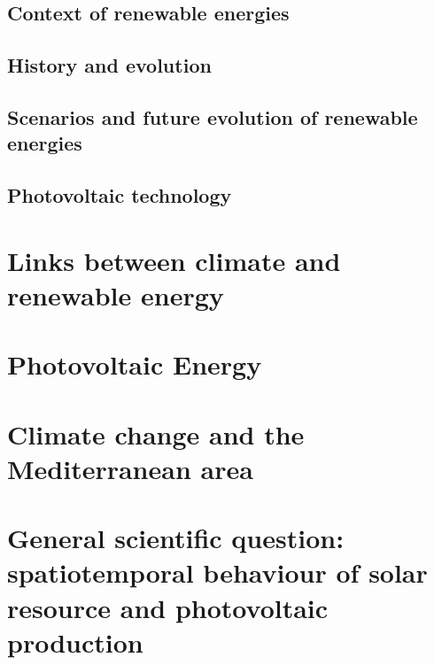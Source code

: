 
\subsection{Context of renewable energies}
\subsection{History and evolution}
\subsection{Scenarios and future evolution of renewable energies}
\subsection{Photovoltaic technology}
\section{Links between climate and renewable energy}



\section{Photovoltaic Energy}
\section{Climate change and the Mediterranean area}
\section{General scientific question: spatiotemporal behaviour of solar resource and photovoltaic production}
